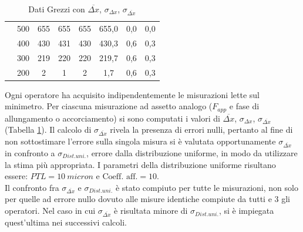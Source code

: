\documentclass[a4paper,11pt,oneside]{article}
\begin{document}
\begin{table}[h!]
\begin{tabular}{|cc|c|c|c||c|c|c|}
        \multicolumn{1}{|c|}{}&500&	655&	655&	655&	655,0&	0,0&	0,0\\
        \multicolumn{1}{|c|}{}&{\cellcolor[rgb]{0.85,0.85,0.85}}400&	{\cellcolor[rgb]{0.85,0.85,0.85}}430&	{\cellcolor[rgb]{0.85,0.85,0.85}}431&	{\cellcolor[rgb]{0.85,0.85,0.85}}430&	{\cellcolor[rgb]{0.85,0.85,0.85}}430,3&	{\cellcolor[rgb]{0.85,0.85,0.85}}0,6&	{\cellcolor[rgb]{0.85,0.85,0.85}}0,3\\
        \multicolumn{1}{|c|}{}&300&	219&	220&	220&	219,7&	0,6&	0,3\\
        \multicolumn{1}{|c|}{}&{\cellcolor[rgb]{0.85,0.85,0.85}}200&	{\cellcolor[rgb]{0.85,0.85,0.85}}2&	{\cellcolor[rgb]{0.85,0.85,0.85}}1&	{\cellcolor[rgb]{0.85,0.85,0.85}}2&	{\cellcolor[rgb]{0.85,0.85,0.85}}1,7&	{\cellcolor[rgb]{0.85,0.85,0.85}}0,6&	{\cellcolor[rgb]{0.85,0.85,0.85}}0,3\\
        \hline
    \end{tabular}
    \caption{Dati Grezzi con $\overline{\Delta x}$, $\sigma_{\Delta x}$, $\sigma_{\overline{\Delta x}}$}
    \label{tab:dati_grezzi_1ac}
\end{table}

Ogni operatore ha acquisito indipendentemente le misurazioni lette sul minimetro. Per ciascuna misurazione ad assetto analogo ($F_{app}$ e fase di allungamento o accorciamento) si sono computati i valori di $\overline{\Delta x}$, $\sigma_{\Delta x}$, $\sigma_{\overline{\Delta x}}$ (Tabella \ref{tab:dati_grezzi_1ac}).
Il calcolo di $\sigma_{\overline{\Delta x}}$ rivela la presenza di errori nulli, pertanto al fine di non sottostimare l'errore sulla singola misura si è valutata opportunamente $\sigma_{\overline{\Delta x}}$ in confronto a $\sigma_{Dist. uni.}$, errore dalla distribuzione uniforme, in modo da utilizzare la stima più appropriata. I parametri della distribuzione uniforme risultano essere: $PTL= \SI{10}{micron}$ e $\text{Coeff. aff.}=\num{10}$.\\
Il confronto fra $\sigma_{\overline{\Delta x}}$ e $\sigma_{Dist. uni.}$ è stato compiuto per tutte le misurazioni, non solo per quelle ad errore nullo dovuto alle misure identiche compiute da tutti e 3 gli operatori. Nel caso in cui $\sigma_{\overline{\Delta x}}$ è risultata minore di $\sigma_{Dist. uni.}$, si è impiegata quest'ultima nei successivi calcoli.\\%
\end{document}

